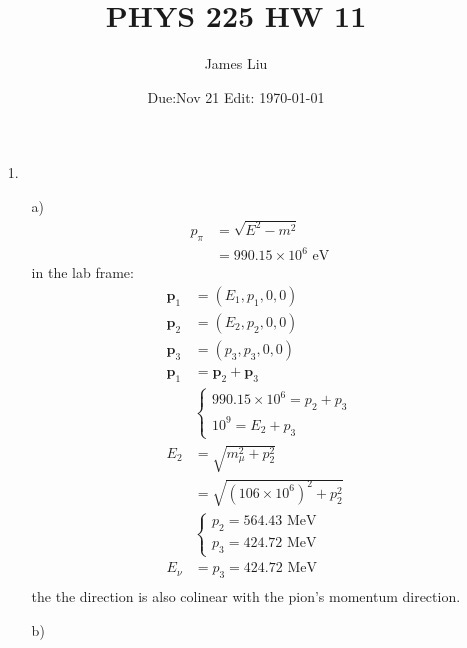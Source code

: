 \documentclass{article}
\date{Due:Nov 21 Edit: \today}
\title{PHYS 225 HW 11}
\author{James Liu}
\begin{document}
\maketitle
\begin{itemize}
    \item [1.]
    \begin{itemize}
        \item [a)]
        \begin{align*}
            p_\pi&=\sqrt{E^2-m^2}\\
            &=990.15 \times 10^6 \text{ eV}
        \end{align*}
        in the lab frame:
        \begin{align*}
            \mathbf{p}_1&=(E_1,p_1,0,0)\\
            \mathbf{p}_2&=(E_2,p_2,0,0)\\
            \mathbf{p}_3&=(p_3,p_3,0,0)\\
            \mathbf{p}_1&=\mathbf{p}_2+\mathbf{p}_3\\
            &\left\{\begin{matrix}
                990.15 \times 10^6 =p_2+p_3\\
                10^9 =E_2+p_3
            \end{matrix}\right.\\
            E_2&=\sqrt{m_{\mu}^2+p_2^2}\\
            &=\sqrt{(106\times 10^6)^2+p_2^2}\\
            &\left\{\begin{matrix}
                p_2=564.43 \text{ MeV}\\
                p_3=424.72 \text{ MeV}
            \end{matrix}\right.\\
            E_\nu &= p_3 = 424.72 \text{ MeV}\\
        \end{align*}
        the the direction is also colinear with the pion's momentum direction.
        \newpage
        \item [b)]\
        \begin{figure}[h]
            \centering

\end{figure}
\end{itemize}
\end{itemize}
\end{document}
